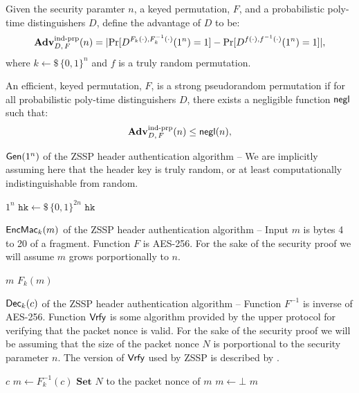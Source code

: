 \documentclass{article}
\begin{document}
\begin{definition}
	Given the security paramter $n$, a keyed permutation, $F$, and a probabilistic poly-time distinguishers $D$, define the advantage of $D$ to be:
	$$\mathbf{Adv}^\text{ind-prp}_{D,\,F}(n) = |\text{Pr}[D^{F_k(\cdot), F_k^{-1}(\cdot)}(1^n) = 1] - \text{Pr}[D^{f(\cdot), f^{-1}(\cdot)}(1^n) = 1]|,$$
	where $k\gets\$\,\{0,1\}^n$ and $f$ is a truly random permutation.

	An efficient, keyed permutation, $F$, is a strong pseudorandom permutation if for all probabilistic poly-time distinguishers $D$, there exists a negligible function $\text{\sf negl}$ such that:
	$$\mathbf{Adv}^\text{ind-prp}_{D,\,F}(n) \leq \text{\sf negl}(n),$$
\end{definition}


\begin{algorithm}
	\caption{$\text{\sf Gen}(1^n)$ of the ZSSP header authentication algorithm -- We are implicitly assuming here that the header key is truly random, or at least computationally indistinguishable from random.}\label{alg:header_gen}
	\begin{algorithmic}
		\Require $1^n$
		\State $\texttt{hk} \gets\$\, \{0,1\}^{2n}$
		\Ensure $\texttt{hk}$
	\end{algorithmic}
\end{algorithm}

\begin{algorithm}
	\caption{$\text{\sf EncMac}_k(m)$ of the ZSSP header authentication algorithm -- Input $m$ is bytes 4 to 20 of a fragment. Function $F$ is AES-256. For the sake of the security proof we will assume $m$ grows porportionally to $n$.}\label{alg:header_encmac}
	\begin{algorithmic}
		\Require $m$
		\Ensure $F_k(m)$
	\end{algorithmic}
\end{algorithm}

\begin{algorithm}
	\caption{$\text{\sf Dec}_k(c)$ of the ZSSP header authentication algorithm -- Function $F^{-1}$ is inverse of AES-256. Function $\text{\sf Vrfy}$ is some algorithm provided by the upper protocol for verifying that the packet nonce is valid. For the sake of the security proof we will be assuming that the size of the packet nonce $N$ is porportional to the security parameter $n$. The version of $\text{\sf Vrfy}$ used by ZSSP is described by .}\label{alg:header_dec}
	\begin{algorithmic}
		\Require $c$
		\State $m \gets F_k^{-1}(c)$
		\State $\textbf{Set } N$ to the packet nonce of $m$
		\If{$\algn{Vrfy}(N) = 0$}
		\State $m \gets \bot$
		\EndIf
		\Ensure $m$
	\end{algorithmic}
\end{algorithm}
\end{document}

